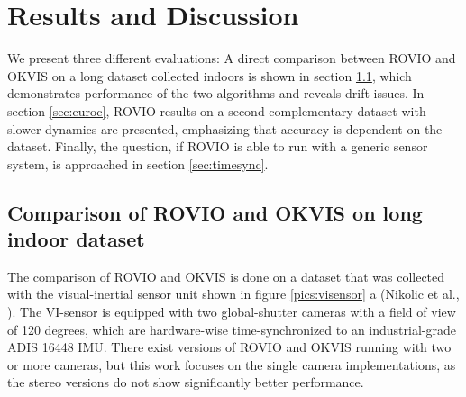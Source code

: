 \chapter{Results and Discussion}
\label{sec:results}

We present three different evaluations: A direct comparison between ROVIO and OKVIS on a long dataset collected indoors is shown in section \ref{sec:ijrr}, which demonstrates performance of the two algorithms and reveals drift issues. In section \ref{sec:euroc}, ROVIO results on a second complementary dataset with slower dynamics are presented, emphasizing that accuracy is dependent on the dataset. Finally, the question, if ROVIO is able to run with a generic sensor system, is approached in section \ref{sec:timesync}.

\section{Comparison of ROVIO and OKVIS on long indoor dataset}
\label{sec:ijrr}

The comparison of ROVIO and OKVIS is done on a dataset that was collected with the visual-inertial sensor unit shown in figure \ref{pics:visensor} a (Nikolic et al., \cite{nikolic2014synchronized}). The VI-sensor is equipped with two global-shutter cameras with a field of view of 120 degrees, which are hardware-wise time-synchronized to an industrial-grade ADIS 16448 IMU. There exist versions of ROVIO and OKVIS running with two or more cameras, but this work focuses on the single camera implementations, as the stereo versions do not show significantly better performance.


